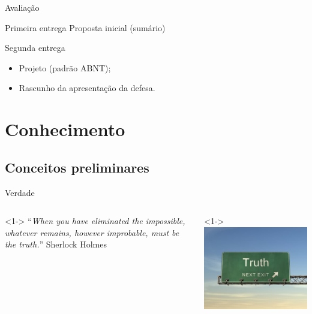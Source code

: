 \documentclass{beamer}
\begin{document}
\begin{frame}{Avaliação}
  \begin{block}{Primeira entrega}
    Proposta inicial (sumário)
  \end{block}

  \pause

  \begin{block}{Segunda entrega}
    \begin{itemize}
    \item Projeto (padrão ABNT);
    \item Rascunho da apresentação da defesa.
    \end{itemize}
  \end{block}

\end{frame}

\section{Conhecimento}

\subsection{Conceitos preliminares}


\begin{frame}{Verdade}
  \begin{columns}
    \begin{column}{6cm}<1-> ``{\em When you have eliminated the
        impossible, whatever remains, however improbable, must be the
        truth.}'' Sherlock Holmes
    \end{column}
    \begin{column}{4cm}<1->
      \includegraphics[height=0.4\textheight]{Intro/truth}
    \end{column}
  \end{columns}
\end{frame}
\end{document}
